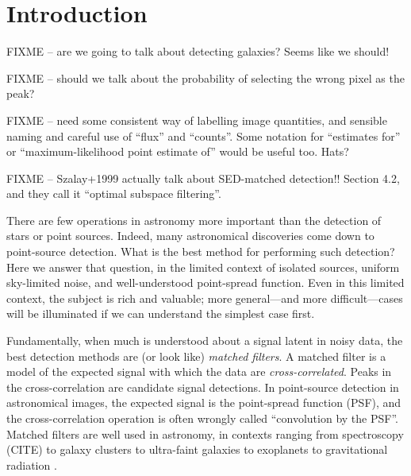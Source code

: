 \documentclass[letterpaper,preprint]{aastex62}
\begin{document}


\section{Introduction}


FIXME -- are we going to talk about detecting galaxies?  Seems like we
should!

FIXME -- should we talk about the probability of selecting the wrong
pixel as the peak?

FIXME -- need some consistent way of labelling image quantities, and
sensible naming and careful use of ``flux'' and ``counts''.  Some
notation for ``estimates for'' or ``maximum-likelihood point estimate
of'' would be useful too.  Hats?

FIXME -- Szalay+1999 actually talk about SED-matched detection!!
Section 4.2, and they call it ``optimal subspace filtering''.


There are few operations in astronomy more important than the
detection of stars or point sources.
Indeed, many astronomical discoveries come down to point-source
detection.
What is the best method for performing such detection?
Here we answer that question, in the limited context of isolated
sources, uniform sky-limited noise, and well-understood point-spread
function.
Even in this limited context, the subject is rich and valuable; more
general---and more difficult---cases will be illuminated if we can
understand the simplest case first.

Fundamentally, when much is understood about a signal latent in noisy
data, the best detection methods are (or look like) \emph{matched
filters}.
A matched filter is a model of the expected signal with which the data
are \emph{cross-correlated}. %
Peaks in the cross-correlation are candidate signal detections.
In point-source detection in astronomical images, the expected signal is the
point-spread function (PSF), and the cross-correlation operation is often
wrongly called ``convolution by the PSF''.
Matched filters are well used in astronomy, in contexts ranging from
spectroscopy (CITE) to
galaxy clusters \cite{redmapper, melin} to
ultra-faint galaxies \cite{willman1} to
exoplanets \cite{exoplanet} to
gravitational radiation \cite{ligo}.

\end{document}
